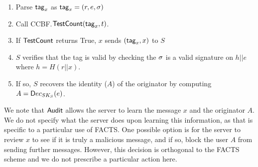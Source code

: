 \begin{algorithm}
\begin{enumerate}
    \item Parse $\mathsf{tag}_x$ as $\mathsf{tag}_x=(r,e,\sigma)$
    \item Call CCBF.$\mathsf{TestCount}(\mathsf{tag}_x,t)$.
    \item If $\mathsf{TestCount}$ returns True, $x$ sends $(\mathsf{tag}_x,x)$ to $S$
    \item $S$ verifies that the tag is valid by checking the $\sigma$ is a valid signature on $h||e$ where $h=H(r||x)$.  
    \item If so, $S$ recovers the identity ($A$) of the originator by computing $A={\mathsf Dec}_{SK_S}(e)$.
\end{enumerate}
\caption{$\audit(C, \tagg_x,x)$}
\end{algorithm}

We note that $\textsf{Audit}$ allows the server to learn the message $x$ and the originator $A$.  We do not specify what the server does upon learning this information, as that is specific to a particular use of FACTS.  One possible option is for the server to review $x$ to see if it is truly a malicious message, and if so, block the user $A$ from sending further messages.  However, this decision is orthogonal to the FACTS scheme and we do not prescribe a particular action here. 

